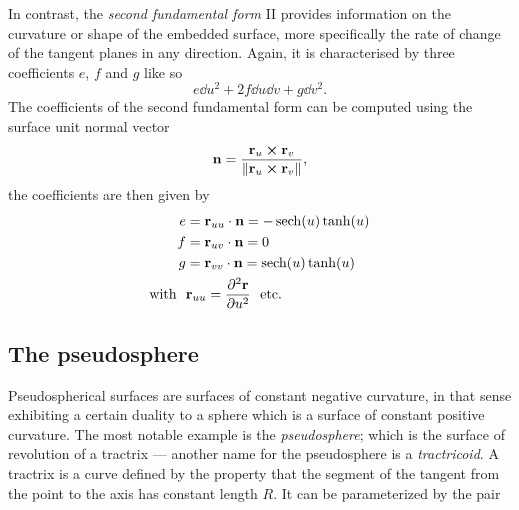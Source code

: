 In contrast, the \emph{second fundamental form} II provides information on the curvature or shape of the embedded surface, more specifically the rate of change of the tangent planes in any direction. Again, it is characterised by three coefficients \(e\), \(f\) and \(g\) like so 
\[ e\dd{u}^2 + 2f\dd{u}\dd{v} + g\dd{v}^2. \]
The coefficients of the second fundamental form can be computed using the surface unit normal vector 
\[
    \vb{n} =  \frac{\vb{r}_u \cross \vb{r}_v}{\norm{\vb{r}_u \cross \vb{r}_v}},
\]
the coefficients are then given by
\begin{equation}
    \begin{split}
        e &= \vb{r}_{uu} \cdot \vb{n} = -\sech(u)\tanh(u)\\
        f &= \vb{r}_{uv} \cdot \vb{n} = 0\\
        g &= \vb{r}_{vv} \cdot \vb{n} = \sech(u)\tanh(u)\\
        \text{with }\ & \vb{r}_{uu} = \pdv[2]{\vb{r}}{u}\ \text{ etc.}
    \end{split}
    \label{eq:second_fform}
\end{equation}


\subsection{The pseudosphere}
Pseudospherical surfaces are surfaces of constant negative curvature, in that sense exhibiting a certain duality to a sphere which is a surface of constant positive curvature. The most notable example is the \emph{pseudosphere}; which is the surface of revolution of a tractrix --- another name for the pseudosphere is a \emph{tractricoid}. A tractrix is a curve defined by the property that the segment of the tangent from the point to the axis has constant length \(R\). It can be parameterized by the pair


